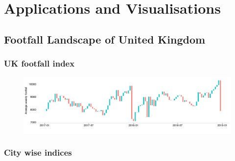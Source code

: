 \chapter{Applications and Visualisations} \label{chapter:application}

\lipsum[1-2]

\section{Footfall Landscape of United Kingdom}
\lipsum[3]
\subsection{UK footfall index}
\lipsum[1]

\begin{figure}
  \includegraphics[trim={0 25 0 10},clip]{images/applications-footfall-index.png}
  \caption{}
  \label{}
\end{figure}

\subsection{City wise indices}
\lipsum[1-2]

